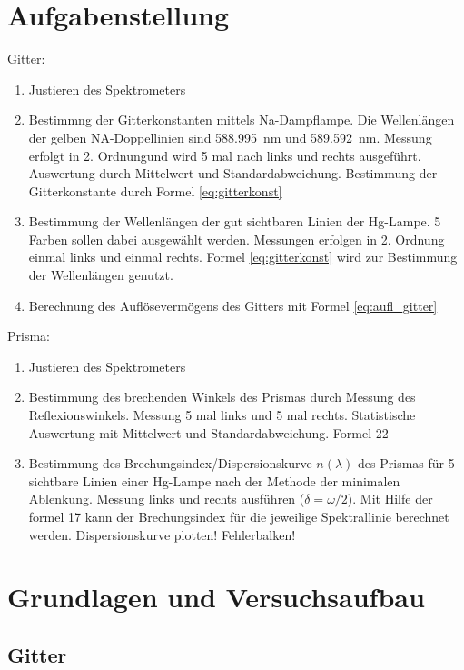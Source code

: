 \documentclass{article}
\begin{document}
\parindent0cm




\pagestyle{fancy}

\section{Aufgabenstellung}

Gitter:
\begin{enumerate}
\item Justieren des Spektrometers
\item Bestimmng der Gitterkonstanten mittels Na-Dampflampe. Die Wellenlängen der gelben NA-Doppellinien sind 588.995~nm und 589.592~nm. Messung erfolgt in 2. Ordnungund wird 5 mal nach links und rechts ausgeführt. Auswertung durch Mittelwert und Standardabweichung. Bestimmung der Gitterkonstante durch Formel \eqref{eq:gitterkonst}
\item Bestimmung der Wellenlängen der gut sichtbaren Linien der Hg-Lampe. 5 Farben sollen dabei ausgewählt werden. Messungen erfolgen in 2. Ordnung einmal links und einmal rechts. Formel \eqref{eq:gitterkonst} wird zur Bestimmung der Wellenlängen genutzt.
\item Berechnung des Auflösevermögens des Gitters mit Formel \eqref{eq:aufl_gitter}
\end{enumerate}


Prisma: 
\begin{enumerate}
\item Justieren des Spektrometers
\item Bestimmung des brechenden Winkels des Prismas durch Messung des Reflexionswinkels. Messung 5 mal links und 5 mal rechts. Statistische Auswertung mit Mittelwert und Standardabweichung. Formel 22
\item Bestimmung des Brechungsindex/Dispersionskurve $n(\lambda)$ des Prismas für 5 sichtbare Linien einer Hg-Lampe nach der Methode der minimalen Ablenkung. Messung links und rechts ausführen ($\delta = \omega/2$). Mit Hilfe der formel 17 kann der Brechungsindex für die jeweilige Spektrallinie berechnet werden. Dispersionskurve plotten! Fehlerbalken!
\end{enumerate}


\section{Grundlagen und Versuchsaufbau}

\subsection{Gitter}
\end{document}

